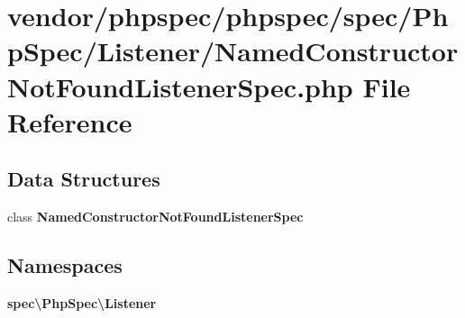 \section{vendor/phpspec/phpspec/spec/\+Php\+Spec/\+Listener/\+Named\+Constructor\+Not\+Found\+Listener\+Spec.php File Reference}
\label{_named_constructor_not_found_listener_spec_8php}
\subsection*{Data Structures}
\begin{DoxyCompactItemize}
\item 
class {\bf Named\+Constructor\+Not\+Found\+Listener\+Spec}
\end{DoxyCompactItemize}
\subsection*{Namespaces}
\begin{DoxyCompactItemize}
\item 
 {\bf spec\textbackslash{}\+Php\+Spec\textbackslash{}\+Listener}
\end{DoxyCompactItemize}
